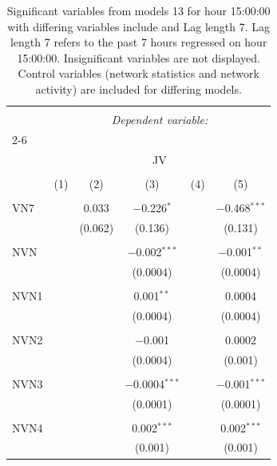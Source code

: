 
\begin{table}[!htbp] \centering 
  \caption{Significant variables from models 13 for hour 15:00:00 with differing variables include 
                               and Lag length 7. Lag length 7 refers to the past 7 hours regressed on hour 15:00:00. 
                               Insignificant variables are not displayed. 
                               Control variables (network statistics and network activity) are 
                               included for differing models.} 
  \label{Jmodels1_t_hourlagged2} 
\scriptsize 
\begin{tabular}{@{\extracolsep{5pt}}lccccc} 
\\[-1.8ex]\hline 
\hline \\[-1.8ex] 
 & \multicolumn{5}{c}{\textit{Dependent variable:}} \\ 
\cline{2-6} 
\\[-1.8ex] & \multicolumn{5}{c}{JV} \\ 
\\[-1.8ex] & (1) & (2) & (3) & (4) & (5)\\ 
\hline \\[-1.8ex] 
 VN7 &  & 0.033 & $-$0.226$^{*}$ &  & $-$0.468$^{***}$ \\ 
  &  & (0.062) & (0.136) &  & (0.131) \\ 
  & & & & & \\ 
 NVN &  &  & $-$0.002$^{***}$ &  & $-$0.001$^{**}$ \\ 
  &  &  & (0.0004) &  & (0.0004) \\ 
  & & & & & \\ 
 NVN1 &  &  & 0.001$^{**}$ &  & 0.0004 \\ 
  &  &  & (0.0004) &  & (0.0004) \\ 
  & & & & & \\ 
 NVN2 &  &  & $-$0.001 &  & 0.0002 \\ 
  &  &  & (0.0004) &  & (0.001) \\ 
  & & & & & \\ 
 NVN3 &  &  & $-$0.0004$^{***}$ &  & $-$0.001$^{***}$ \\ 
  &  &  & (0.0001) &  & (0.0001) \\ 
  & & & & & \\ 
 NVN4 &  &  & 0.002$^{***}$ &  & 0.002$^{***}$ \\ 
  &  &  & (0.001) &  & (0.001) \\ 

\end{tabular}
\end{table}
